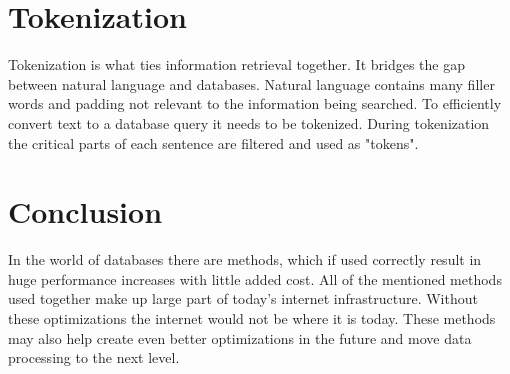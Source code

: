 \documentclass[10pt,twoside,a4paper]{article}
\begin{document}

\section{Tokenization}
Tokenization is what ties information retrieval together. It bridges the gap between natural language and databases. 
Natural language contains many filler words and padding not relevant to the information being searched. To efficiently convert text to a database query it needs to be tokenized. During tokenization the critical parts of each sentence are filtered and used as "tokens". \cite{Effective-Tokenization} %

\section{Conclusion}
In the world of databases there are methods, which if used correctly result in huge performance increases with little added cost. All of the mentioned methods used together make up large part of today's internet infrastructure. Without these optimizations the internet would not be where it is today. These methods may also help create even better optimizations in the future and move data processing to the next level. %





\end{document}
